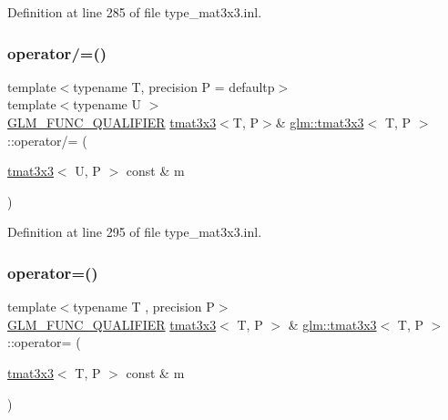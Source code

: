 Definition at line 285 of file type\+\_\+mat3x3.\+inl.

\mbox{\label{structglm_1_1tmat3x3_a0adc3f9a1be28dd0e4ea34c816b364fc}} 
\subsubsection{\texorpdfstring{operator/=()}{operator/=()}\hspace{0.1cm}{\footnotesize\ttfamily [4/4]}}
{\footnotesize\ttfamily template$<$typename T, precision P = defaultp$>$ \\
template$<$typename U $>$ \\
\mbox{\hyperlink{setup_8hpp_a33fdea6f91c5f834105f7415e2a64407}{G\+L\+M\+\_\+\+F\+U\+N\+C\+\_\+\+Q\+U\+A\+L\+I\+F\+I\+ER}} \mbox{\hyperlink{structglm_1_1tmat3x3}{tmat3x3}}$<$T, P$>$\& \mbox{\hyperlink{structglm_1_1tmat3x3}{glm\+::tmat3x3}}$<$ T, P $>$\+::operator/= (\begin{DoxyParamCaption}\item[{\mbox{\hyperlink{structglm_1_1tmat3x3}{tmat3x3}}$<$ U, P $>$ const \&}]{m }\end{DoxyParamCaption})}



Definition at line 295 of file type\+\_\+mat3x3.\+inl.

\mbox{\label{structglm_1_1tmat3x3_a6a587ae3bc7c9ad30a5d05a789a809db}} 
\subsubsection{\texorpdfstring{operator=()}{operator=()}\hspace{0.1cm}{\footnotesize\ttfamily [1/3]}}
{\footnotesize\ttfamily template$<$typename T , precision P$>$ \\
\mbox{\hyperlink{setup_8hpp_a33fdea6f91c5f834105f7415e2a64407}{G\+L\+M\+\_\+\+F\+U\+N\+C\+\_\+\+Q\+U\+A\+L\+I\+F\+I\+ER}} \mbox{\hyperlink{structglm_1_1tmat3x3}{tmat3x3}}$<$ T, P $>$ \& \mbox{\hyperlink{structglm_1_1tmat3x3}{glm\+::tmat3x3}}$<$ T, P $>$\+::operator= (\begin{DoxyParamCaption}\item[{\mbox{\hyperlink{structglm_1_1tmat3x3}{tmat3x3}}$<$ T, P $>$ const \&}]{m }\end{DoxyParamCaption})}



